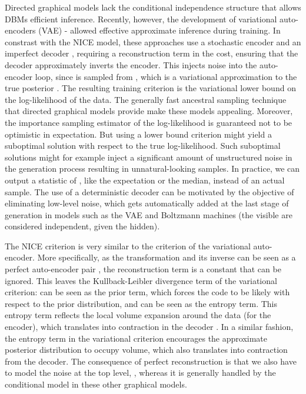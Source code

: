 \documentclass{article}
\begin{document}
Directed graphical models lack the conditional independence structure
that allows DBMs efficient inference.
Recently, however, the development of variational auto-encoders (VAE) 
\citep{Kingma+Welling-ICLR2014,
Rezende-et-al-arxiv2014,Mnih+Gregor-ICML2014,Gregor-et-al-ICML2014} - allowed
effective approximate inference during training.
In constrast with the NICE model, these approaches use
a stochastic encoder  and an imperfect decoder ,
requiring a reconstruction
term in the cost, ensuring that
the decoder approximately inverts the encoder.
This injects noise into the auto-encoder loop, since  is sampled from ,
which is a variational approximation to the true posterior .
The resulting training criterion is the variational lower bound on the log-likelihood of the data.
The generally fast ancestral sampling technique that directed graphical models provide make these models appealing. 
Moreover, the importance sampling estimator of the log-likelihood is guaranteed not to be optimistic in expectation. 
But using a lower bound criterion might yield a suboptimal solution with respect to the true log-likelihood.
Such suboptimal solutions might for example inject a significant amount of unstructured noise in the generation
process resulting in unnatural-looking samples.
In practice, we can output a statistic of , like the expectation
or the median, instead of an actual sample. 
The use of a deterministic decoder can be motivated by the objective of eliminating low-level noise,
which gets automatically added at the last stage of generation in models 
such as the VAE and Boltzmann machines (the visible are considered independent, given the hidden).


The NICE criterion is very similar to the criterion of the variational auto-encoder.
More specifically, as the transformation and its
inverse can be seen as a perfect auto-encoder pair \citep{Bengio-arxiv2014},
the reconstruction term is a constant that can be ignored.
This leaves the Kullback-Leibler divergence term of the variational
criterion:  can be seen as the prior term, which forces the
code  to be likely with respect to the prior distribution, and
 can be seen as
the entropy term. This entropy term reflects the local volume expansion around
the data (for the encoder), which translates into contraction in the decoder . In a
similar fashion, the entropy term in the variational criterion encourages
the approximate posterior distribution to occupy volume, which also translates
into contraction from the decoder.
The consequence of perfect reconstruction is
that we also have to model the noise at the top level, , whereas it is generally handled by the
conditional model  in these other graphical models.
\end{document}
